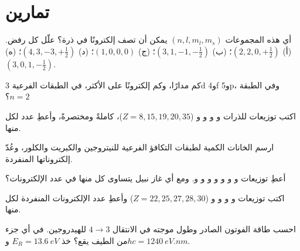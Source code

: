 \section{تمارين}

\begin{exercise}[$\star$]\label{exo:b1:quantum-numbers:1}
أي هذه المجموعات $(n, l, m_l, m_s)$ يمكن أن تصف إلكترونًا في
ذرة؟ علّل كل رفض.
(أ) $(2, 2, 0, +\tfrac12)$؛ (ب) $(3, 1, -1, -\tfrac12)$؛
(ج) $(1, 0, 0, 0)$؛ (د) $(4, 3, -3, +\tfrac12)$؛ (ه) $(3, 0, 1, -\tfrac12)$.
\end{exercise}

\begin{exercise}[$\star$]\label{exo:b1:quantum-numbers:2}
كم مدارًا، وكم إلكترونًا على الأكثر، في الطبقات
الفرعية 3d و4f و5p، وفي الطبقة $n = 2$؟
\end{exercise}

\begin{exercise}[$\star$]\label{exo:b1:quantum-numbers:3}
اكتب توزيعات  للذرات  و و و
و ($Z = 8, 15, 19, 20, 35$)، كاملةً ومختصرةً، وأعطِ
عدد  لكل منها.
\end{exercise}

\begin{exercise}[$\star$]\label{exo:b1:quantum-numbers:4}
ارسم الخانات الكمية لطبقات التكافؤ الفرعية للنيتروجين والكبريت
والكلور، وعُدّ إلكتروناتها المنفردة.
\end{exercise}

\begin{exercise}[$\star\star$]\label{exo:b1:quantum-numbers:5}
أعطِ توزيعات  و و و
و و و و. ومع أي غاز نبيل
يتساوى كل منها في عدد الإلكترونات؟
\end{exercise}

\begin{exercise}[$\star\star$]\label{exo:b1:quantum-numbers:6}
اكتب توزيعات  و و
و و ($Z = 22, 25, 27, 28, 30$) وأعطِ
عدد الإلكترونات المنفردة لكل منها.
\end{exercise}

\begin{exercise}[$\star\star$]\label{exo:b1:quantum-numbers:7}
احسب طاقة الفوتون الصادر وطول موجته في الانتقال
$4 \to 3$ للهيدروجين. في أي جزء من الطيف يقع؟
خذ $E_R = \qty{13.6}{eV}$ و$hc = \qty{1240}{eV.nm}$.
\end{exercise}

